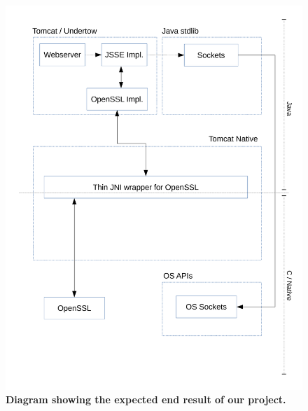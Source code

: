 \documentclass[11pt,a4paper,bibliography=totocnumbered]{scrartcl}
\begin{document}
\begin{figure}[!h]
\begin{center}
\includegraphics[scale=0.7]{diagram_goal.pdf}
\end{center}
\caption{\textbf{Diagram showing the expected end result of our project.}}
\label{fig:goal}
\end{figure}
\end{document}

